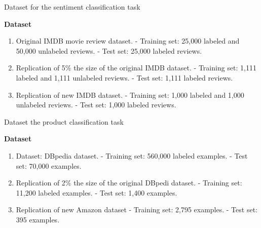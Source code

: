 \documentclass[aspectratio=169,xcolor=dvipsnames]{beamer}
\begin{document}
\begin{frame}{Dataset for the sentiment classification task}
    \tableofcontents

    \textbf{Dataset}
    \begin{enumerate}
        \item Original IMDB  movie review dataset.\break 
            - Training set: 25,000 labeled and 50,000 unlabeled reviews.\break 
            - Test set: 25,000 labeled reviews.\break
            
         \item  Replication of 5\% the size of the original IMDB dataset.\break 
            - Training set: 1,111 labeled and 1,111 unlabeled reviews.\break 
            - Test set: 1,111 labeled reviews.\break
            
        \item Replication of new IMDB dataset.\break 
            - Training set: 1,000 labeled and 1,000 unlabeled reviews.\break 
            - Test set: 1,000 labeled reviews.\break
        \end{enumerate}
\end{frame}

\begin{frame}{Dataset the product classification task}
    \tableofcontents

    \textbf{Dataset}
        \begin{enumerate}
        \item Dataset: DBpedia dataset.\break 
            - Training set: 560,000 labeled examples.\break
            - Test set: 70,000 examples.\break
         
         \item Replication of 2\% the size of the original DBpedi dataset.\break 
            - Training set: 11,200 labeled examples.\break 
            - Test set: 1,400 examples.\break
        
        \item Replication of new Amazon dataset\break 
            - Training set: 2,795 examples.\break 
            - Test set: 395 examples.\break
        \end{enumerate}
\end{frame}
\end{document}
